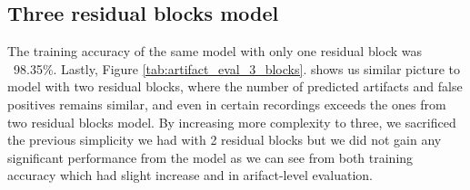 \documentclass[12pt,a4paper,titlepage,openany]{report}
\begin{document}
\begin{table}[htbp]
\centering
{}
\caption{Artifact-level evaluation of model predictions with two residual blocks}
\label{tab:artifact_eval_2_blocks}
\end{table}

\subsection{Three residual blocks model}

The training accuracy of the same model with only one residual block was ~98.35\%.
Lastly, Figure \ref{tab:artifact_eval_3_blocks}. shows us similar picture to model with two residual blocks, where the number of predicted artifacts and false positives remains similar, and even in certain recordings exceeds the ones from two residual blocks model. By increasing more complexity to three, we sacrificed the previous simplicity we had with 2 residual blocks but we did not gain any significant performance from the model as we can see from both training accuracy which had slight increase and in arifact-level evaluation. 
\end{document}
